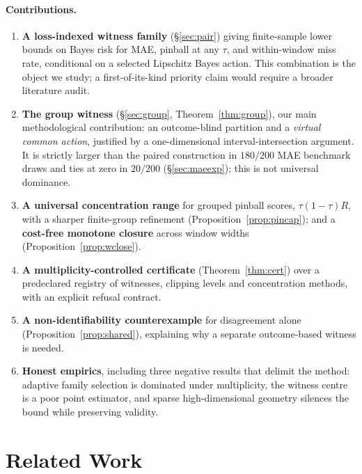 \documentclass[11pt]{article}
\theoremstyle{definition}
\begin{document}
\paragraph{Contributions.}
\begin{enumerate}\itemsep1pt
\item \textbf{A loss-indexed witness family} (\S\ref{sec:pair}) giving finite-sample lower bounds on Bayes risk for MAE, pinball at any $\tau$, and within-window miss rate, conditional on a selected Lipschitz Bayes action. This combination is the object we study; a first-of-its-kind priority claim would require a broader literature audit.
\item \textbf{The group witness} (\S\ref{sec:group}, Theorem~\ref{thm:group}), our main methodological contribution: an outcome-blind partition and a \emph{virtual common action}, justified by a one-dimensional interval-intersection argument. It is strictly larger than the paired construction in $180/200$ MAE benchmark draws and ties at zero in $20/200$ (\S\ref{sec:maeexp}); this is not universal dominance.
\item \textbf{A universal concentration range} for grouped pinball scores, $\tau(1-\tau)R$, with a sharper finite-group refinement (Proposition~\ref{prop:pincap}); and a \textbf{cost-free monotone closure} across window widths (Proposition~\ref{prop:wclose}).
\item \textbf{A multiplicity-controlled certificate} (Theorem~\ref{thm:cert}) over a predeclared registry of witnesses, clipping levels and concentration methods, with an explicit refusal contract.
\item \textbf{A non-identifiability counterexample} for disagreement alone (Proposition~\ref{prop:shared}), explaining why a separate outcome-based witness is needed.
\item \textbf{Honest empirics}, including three negative results that delimit the method: adaptive family selection is dominated under multiplicity, the witness centre is a poor point estimator, and sparse high-dimensional geometry silences the bound while preserving validity.
\end{enumerate}

\section{Related Work}
\end{document}

